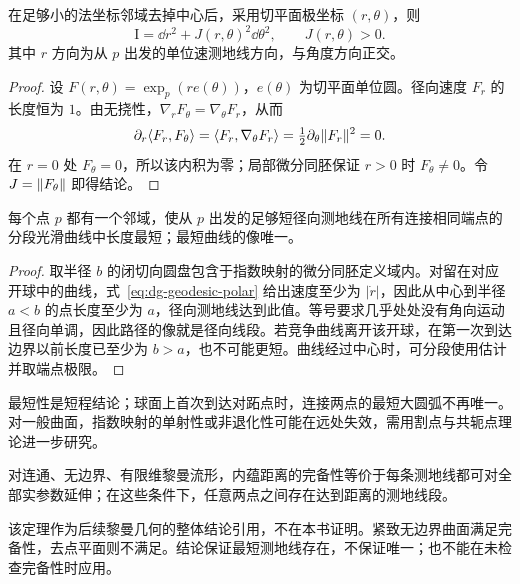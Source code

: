 \begin{lemma}
在足够小的法坐标邻域去掉中心后，采用切平面极坐标 $(r,\theta)$，则
\begin{equation}
 \mathrm I=\dd r^2+J(r,\theta)^2\dd\theta^2,
 \qquad J(r,\theta)>0.
 \label{eq:dg-geodesic-polar}
\end{equation}
其中 $r$ 方向为从 $p$ 出发的单位速测地线方向，与角度方向正交。
\end{lemma}
\begin{proof}
设 $F(r,\theta)=\exp_p(r e(\theta))$，$e(\theta)$ 为切平面单位圆。径向速度 $F_r$ 的长度恒为 $1$。由无挠性，$\nabla_rF_\theta=\nabla_\theta F_r$，从而
\[
 \partial_r\langle F_r,F_\theta\rangle
 =\langle F_r,\nabla_\theta F_r\rangle
 =\tfrac12\partial_\theta\lVert F_r\rVert^2=0.
\]
在 $r=0$ 处 $F_\theta=0$，所以该内积为零；局部微分同胚保证 $r>0$ 时 $F_\theta\ne0$。令 $J=\lVert F_\theta\rVert$ 即得结论。
\end{proof}

\begin{theorem}[足够短的测地线实现距离]
每个点 $p$ 都有一个邻域，使从 $p$ 出发的足够短径向测地线在所有连接相同端点的分段光滑曲线中长度最短；最短曲线的像唯一。
\end{theorem}
\begin{proof}
取半径 $b$ 的闭切向圆盘包含于指数映射的微分同胚定义域内。对留在对应开球中的曲线，式~\eqref{eq:dg-geodesic-polar} 给出速度至少为 $|\dot r|$，因此从中心到半径 $a<b$ 的点长度至少为 $a$，径向测地线达到此值。等号要求几乎处处没有角向运动且径向单调，因此路径的像就是径向线段。若竞争曲线离开该开球，在第一次到达边界以前长度已至少为 $b>a$，也不可能更短。曲线经过中心时，可分段使用估计并取端点极限。
\end{proof}
最短性是短程结论；球面上首次到达对跖点时，连接两点的最短大圆弧不再唯一。对一般曲面，指数映射的单射性或非退化性可能在远处失效，需用割点与共轭点理论进一步研究。

\begin{theorem}
对连通、无边界、有限维黎曼流形，内蕴距离的完备性等价于每条测地线都可对全部实参数延伸；在这些条件下，任意两点之间存在达到距离的测地线段。
\end{theorem}
该定理作为后续黎曼几何的整体结论引用，不在本书证明。紧致无边界曲面满足完备性，去点平面则不满足。结论保证最短测地线存在，不保证唯一；也不能在未检查完备性时应用。

